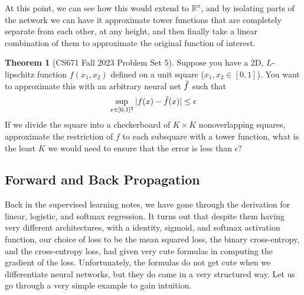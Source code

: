 \documentclass{article}
\theoremstyle{definition}
\newtheorem{theorem}{Theorem}[section]
\theoremstyle{remark}
\theoremstyle{definition}
\begin{document}
At this point, we can see how this would extend to $\mathbb{R}^n$, and by isolating parts of the network we can have it approximate tower functions that are completely separate from each other, at any height, and then finally take a linear combination of them to approximate the original function of interest.  

\begin{theorem}[CS671 Fall 2023 Problem Set 5]
Suppose you have a 2D, $L$-lipschitz function $f(x_1, x_2)$ defined on a unit square ($x_1, x_2 \in \left [0,1 \right ]$). You want to approximate this with an arbitrary neural net $\Tilde{f}$ such that
\[\sup_{x \in [0, 1]^2} |f(x) - \Tilde{f}(x)| \leq \epsilon\]    
If we divide the square into a checkerboard of $K \times K$ nonoverlapping squares, approximate the restriction of $f$ to each subsquare with a tower function, what is the least $K$ we would need to ensure that the error is less than $\epsilon$? 
\end{theorem} 


\subsection{Forward and Back Propagation}

Back in the supervised learning notes, we have gone through the derivation for linear, logistic, and softmax regression. It turns out that despite them having very different architectures, with a identity, sigmoid, and softmax activation function, our choice of loss to be the mean squared loss, the binary cross-entropy, and the cross-entropy loss, had given very cute formulas in computing the gradient of the loss. Unfortunately, the formulas do not get cute when we differentiate neural networks, but they do come in a very structured way. Let us go through a very simple example to gain intuition. 
\end{document}
